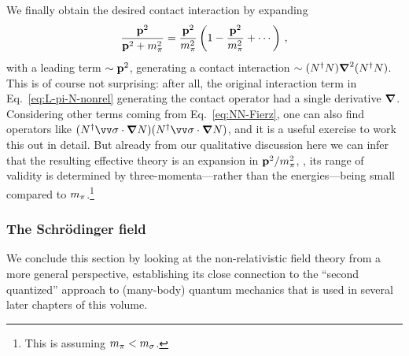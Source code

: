 %
We finally obtain the desired contact interaction by expanding
%
\begin{equation}
 \frac{\mathbf{p}^2}{\strut\mathbf{p}^2+m_\pi^2}
 = \frac{\mathbf{p}^2}{m_\pi^2} \left(1 - \frac{\mathbf{p}^2}{m_\pi^2} + \cdots\right) \,,
\end{equation}
%
with a leading term $\sim\mathbf{p}^2$, generating a contact interaction $\sim 
(N^\dagger N)\boldsymbol{\nabla}^2(N^\dagger N)$.  This is of course not surprising: after 
all, the original interaction term in Eq.~\eqref{eq:L-pi-N-nonrel} generating 
the contact operator had a single derivative $\boldsymbol{\nabla}$.  Considering other 
terms coming from Eq.~\eqref{eq:NN-Fierz}, one can also find operators like 
$(N^\dagger \skvec{\sigma}\cdot\vNabla N)(N^\dagger \skvec{\sigma}\cdot\vNabla 
N)$, and it is a useful exercise to work this out in detail.  But already from 
our qualitative discussion here we can infer that the resulting effective 
theory is an expansion in $\mathbf{p}^2/m_\pi^2$, \ie, its range of validity is 
determined by three-momenta---rather than the energies---being small 
compared to $m_\pi$.\footnote{This is assuming $m_\pi<m_\sigma$.}

\subsubsection{The Schr\"odinger field}

We conclude this section by looking at the non-relativistic field theory from
a more general perspective, establishing its close connection to the ``second
quantized'' approach to (many-body) quantum mechanics that is used 
in several later chapters of this volume.

